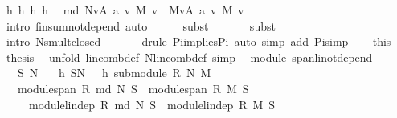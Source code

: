 \begin{isabellebody}
\ h{}\ h{}\ h{}\ h{}\ \isamarkupfalse%
\ {\isachardoublequoteopen}{\isacharparenleft}{\isasymOplus}\isactrlbsub {\isacharparenleft}md\ N{\isacharparenright}\isactrlesub v{\isasymin}A{\isachardot}\ a\ v\ {\isasymodot}\isactrlbsub M\isactrlesub \ v{\isacharparenright}\ {\isacharequal}\ {\isacharparenleft}{\isasymOplus}\isactrlbsub M\isactrlesub v{\isasymin}A{\isachardot}\ a\ v\ {\isasymodot}\isactrlbsub M\isactrlesub \ v{\isacharparenright}{\isachardoublequoteclose}\isanewline
\ \ \ \ \isamarkupfalse%
\ {\isacharparenleft}intro\ finsum{\isacharunderscore}not{\isacharunderscore}depend{\isacharcomma}\ auto{\isacharparenright}\isanewline
\ \ \ \ \isamarkupfalse%
\ {\isacharparenleft}subst\ {}{\isacharparenright}\isanewline
\ \ \ \ \isamarkupfalse%
\ {\isacharparenleft}subst\ {}{\isacharparenright}\isanewline
\ \ \ \ \isamarkupfalse%
\ {\isacharparenleft}intro\ N{\isachardot}smult{\isacharunderscore}closed{\isacharparenright}\isanewline
\ \ \ \ \ \isamarkupfalse%
\ {\isacharparenleft}drule\ Pi{\isacharunderscore}implies{\isacharunderscore}Pi{}{\isacharcomma}\ auto\ simp\ add{\isacharcolon}\ Pi{\isacharunderscore}simp{\isacharparenright}\isanewline
\ \ \isamarkupfalse%
\ this\ \isamarkupfalse%
\ {\isacharquery}thesis\ \isamarkupfalse%
\ {\isacharparenleft}unfold\ lincomb{\isacharunderscore}def\ N{\isachardot}lincomb{\isacharunderscore}def{\isacharcomma}\ simp{\isacharparenright}\isanewline
{}\isamarkupfalse%
%
\endisatagproof
{\isafoldproof}%
%
\isadelimproof
\isanewline
%
\endisadelimproof
\isanewline
{}\isamarkupfalse%
\ {\isacharparenleft}\ module{\isacharparenright}\ span{\isacharunderscore}li{\isacharunderscore}not{\isacharunderscore}depend{\isacharcolon}\isanewline
\ \ \ S\ N\isanewline
\ \ \ h{}{\isacharcolon}\ {\isachardoublequoteopen}S{\isasymsubseteq}N{\isachardoublequoteclose}\ \ \ h{}{\isacharcolon}\ {\isachardoublequoteopen}submodule\ R\ N\ M{\isachardoublequoteclose}\isanewline
\ \ \ {\isachardoublequoteopen}module{\isachardot}span\ R\ {\isacharparenleft}md\ N{\isacharparenright}\ S\ {\isacharequal}\ module{\isachardot}span\ R\ M\ S{\isachardoublequoteclose}\isanewline
\ \ \ \ \ {\isachardoublequoteopen}module{\isachardot}lin{\isacharunderscore}dep\ R\ {\isacharparenleft}md\ N{\isacharparenright}\ S\ {\isacharequal}\ module{\isachardot}lin{\isacharunderscore}dep\ R\ M\ S{\isachardoublequoteclose}\isanewline

\end{isabellebody}
